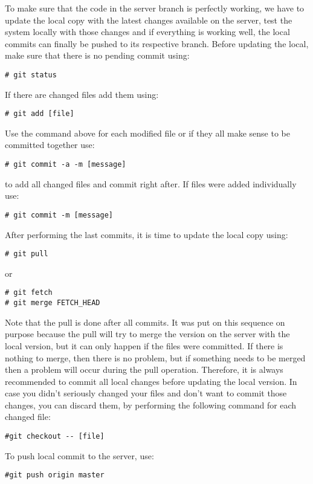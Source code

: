 \documentclass[envcountsame,envcountchap,letterpaper]{svmono}
\begin{document}
To make sure that the code in the server branch is perfectly working, we have to update the local copy with the latest changes available on the server, test the system locally with those changes and if everything is working well, the local commits can finally be pushed to its respective branch. Before updating the local, make sure that there is no pending commit using:
\begin{verbatim}
# git status
\end{verbatim}
If there are changed files add them using:
\begin{verbatim}
# git add [file]
\end{verbatim}
Use the command above for each modified file or if they all make sense to be committed together use:
\begin{verbatim}
# git commit -a -m [message]
\end{verbatim}
to add all changed files and commit right after. If files were added individually use:
\begin{verbatim}
# git commit -m [message]
\end{verbatim}

After performing the last commits, it is time to update the local copy using:
\begin{verbatim}
# git pull
\end{verbatim}
or
\begin{verbatim}
# git fetch
# git merge FETCH_HEAD
\end{verbatim}

Note that the pull is done after all commits. It was put on this sequence on purpose because the pull will try to merge the version on the server with the local version, but it can only happen if the files were committed. If there is nothing to merge, then there is no problem, but if something needs to be merged then a problem will occur during the pull operation. Therefore, it is always recommended to commit all local changes before updating the local version. In case you didn't seriously changed your files and don't want to commit those changes, you can discard them, by performing the following command for each changed file:

\begin{verbatim}
#git checkout -- [file]
\end{verbatim}

To push local commit to the server, use:

\begin{verbatim}
#git push origin master
\end{verbatim}
\end{document}
